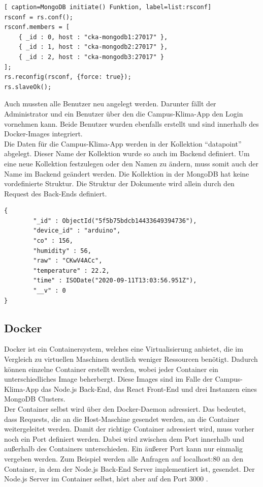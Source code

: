 \documentclass{article}
\begin{document}
\begin{lstlisting}[ caption=MongoDB initiate() Funktion, label=list:rsconf]
rsconf = rs.conf();
rsconf.members = [
    { _id : 0, host : "cka-mongodb1:27017" },
    { _id : 1, host : "cka-mongodb2:27017" },
    { _id : 2, host : "cka-mongodb3:27017" }
];
rs.reconfig(rsconf, {force: true});
rs.slaveOk();
\end{lstlisting}

Auch mussten alle Benutzer neu angelegt werden. Darunter fällt der Administrator und ein Benutzer über den die Campus-Klima-App den Login vornehmen kann. 
Beide Benutzer wurden ebenfalls erstellt und sind innerhalb des Docker-Images integriert.  \\
\newpage
Die Daten für die Campus-Klima-App werden in der Kollektion "`datapoint"' abgelegt.
Dieser Name der Kollektion wurde so auch im Backend definiert. 
Um eine neue Kollektion festzulegen oder den Namen zu ändern, muss somit auch der Name im Backend geändert werden.
Die Kollektion in der MongoDB hat keine vordefinierte Struktur.
Die Struktur der Dokumente wird allein durch den Request des Back-Ends definiert.
\begin{lstlisting}[caption=Eine Dokument für mit Sensordaten, label=dataset]
{
        "_id" : ObjectId("5f5b75bdcb14433649394736"),
        "device_id" : "arduino",
        "co" : 156,
        "humidity" : 56,
        "raw" : "CKwV4ACc",
        "temperature" : 22.2,
        "time" : ISODate("2020-09-11T13:03:56.951Z"),
        "__v" : 0
}
\end{lstlisting}
\subsection{Docker}
Docker ist ein Containersystem, welches eine Virtualisierung anbietet, die im Vergleich zu virtuellen Maschinen deutlich weniger Ressourcen benötigt. 
Dadurch können einzelne Container erstellt werden, wobei jeder Container ein unterschiedliches Image beherbergt.
Diese Images sind im Falle der Campus-Klima-App das Node.js Back-End, das React Front-End und drei Instanzen eines MongoDB Clusters.\\

Der Container selbst wird über den Docker-Daemon adressiert. Das bedeutet, dass Requests, die an die Host-Maschine gesendet werden, an die Container weitergeleitet werden.
Damit der richtige Container adressiert wird, muss vorher noch ein Port definiert werden.
Dabei wird zwischen dem Port innerhalb und außerhalb des Containers unterschieden. 
Ein äußerer Port kann nur einmalig vergeben werden. 
Zum Beispiel werden alle Anfragen auf localhost:80 an den Container, in dem der Node.js Back-End Server implementiert ist, gesendet. Der Node.js Server im Container selbst, hört aber auf den Port 3000 \cite[12-13]{Vohra.2016}.\\
\end{document}
